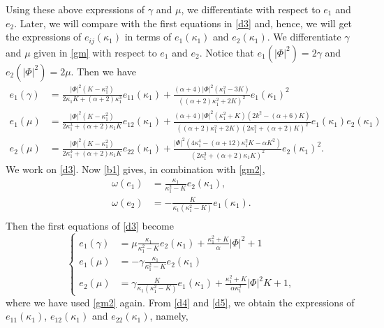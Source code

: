 \documentclass[a4paper,12pt]{amsart}
\theoremstyle{definition}
\begin{document}
 Using these above expressions of $\gamma$ and $\mu$, we differentiate with respect to $e_1$ and $e_2$. Later, we will compare with the first equations in \eqref{d3} and, hence, we will get the expressions of $e_{ij}(\kappa_1)$ in terms of $e_1(\kappa_1)$ and $e_2(\kappa_1)$.  We differentiate $\gamma$ and $\mu$ given in \eqref{gm} with respect to $e_1$ and $e_2$. Notice that  $e_1(|\Phi|^2)= 2\gamma$ and  $e_2(|\Phi|^2)= 2\mu$. Then we have
\begin{equation}\label{d4}
\begin{split}
 e_1(\gamma)&=\frac{|\Phi|^2(K-\kappa_1^2)}{2\kappa_1 K+(\alpha +2)\kappa_1^3}e_{11}(\kappa_1)+\frac{(\alpha +4)   |\Phi|^2 \left(\kappa_1^2-3 K\right)}{\left((\alpha +2) \kappa_1^2+2 K\right)^2}e_1(\kappa_1)^2\\ 
 e_1(\mu)&= \frac{|\Phi|^2(K-\kappa_1^2)}{2\kappa_1^3+(\alpha +2)\kappa_1 K}e_{12}(\kappa_1)+\frac{(\alpha +4) |\Phi|^2 \left(\kappa_1^2+K\right) \left(2 k^2-(\alpha +6) K\right)}{\left((\alpha +2)\kappa_1^2+2 K\right) \left(2 \kappa_1^2+(\alpha +2) K\right)^2}e_1(\kappa_1)e_2(\kappa_1)\\
 e_2(\mu)&=\frac{|\Phi|^2(K-\kappa_1^2)}{2\kappa_1^3+(\alpha +2)\kappa_1 K}e_{22}(\kappa_1)+\frac{  |\Phi|^2 \left(4 \kappa_1^4-(\alpha +12) \kappa_1^2 K-\alpha  K^2\right)}{\left(2 \kappa_1^3+(\alpha +2) \kappa_1 K\right)^2}e_2(\kappa_1)^2.
 \end{split}
 \end{equation}
We work on \eqref{d3}. Now \eqref{b1} gives, in combination with \eqref{gm2}, 
\begin{equation*}
\begin{split}
\omega(e_1)&=\frac{\kappa_1}{\kappa_1^2-K}e_2(\kappa_1),\\
\omega(e_2)&=-\frac{K}{\kappa_1(\kappa_1^2-K)}e_1(\kappa_1).\\
\end{split}
\end{equation*}
Then the first equations of \eqref{d3} become
    \begin{equation}\label{d5}
    \left\{
\begin{split}
e_{1}(\gamma)&=\mu\frac{\kappa_1}{\kappa_1^2-K}e_2(\kappa_1)+\frac{\kappa_1^2+K}{\alpha }|\Phi|^2  +1\\
 e_{1}(\mu)&=-\gamma\frac{\kappa_1}{\kappa_1^2-K}e_2(\kappa_1)\\
 e_{2}(\mu)&=\gamma \frac{K}{\kappa_1(\kappa_1^2-K)}e_1(\kappa_1)+\frac{\kappa_1^2+K}{\alpha\kappa_1^2}|\Phi|^2 K+1,
      \end{split}\right.
   \end{equation}
where we have used \eqref{gm2} again.  From \eqref{d4} and \eqref{d5}, we obtain the expressions of $e_{11}(\kappa_1)$, $e_{12}(\kappa_1)$ and $e_{22}(\kappa_1)$, namely,
\end{document}
